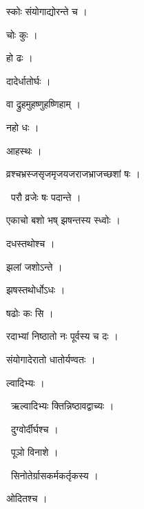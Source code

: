 \documentclass[10pt, openany, oneside]{book}
\begin{document}
\noindent स्कोः संयोगाद्योरन्ते च ।

\noindent चोः कुः ।

\noindent हो ढः ।

\noindent दादेर्धातोर्घः ।

\noindent वा द्रुहमुहष्णुहष्णिहाम् ।

\noindent नहो धः ।

\noindent आहस्थः ।

\noindent व्रश्चभ्रस्जसृजमृजयजराजभ्राजच्छशां षः ।

\par\noindent\hspace{1.5em}{\vps वा॰}~{\qt परौ व्रजेः षः पदान्ते ।}

\noindent एकाचो बशो भष् झषन्तस्य स्ध्वोः ।

\noindent दधस्तथोश्च ।

\noindent झलां जशोऽन्ते ।

\noindent झषस्तथोर्धोऽधः ।

\noindent षढोः कः सि ।

\noindent रदाभ्यां निष्ठातो नः पूर्वस्य च दः ।

\noindent संयोगादेरातो धातोर्यण्वतः ।

\noindent ल्वादिभ्यः ।

\par\noindent\hspace{1.5em}{\vps वा॰}~{\qt ऋल्वादिभ्यः क्तिन्निष्ठावद्वाच्यः ।}

\par\noindent\hspace{1.5em}{\vps वा॰}~{\qt दुग्वोर्दीर्घश्च ।}

\par\noindent\hspace{1.5em}{\vps वा॰}~{\qt पूञो विनाशे ।}

\par\noindent\hspace{1.5em}{\vps वा॰}~{\qt सिनोतेर्ग्रासकर्मकर्तृकस्य ।}

\noindent ओदितश्च ।
\end{document}
